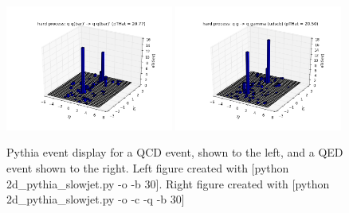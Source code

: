 \documentclass[11pt]{article}
\begin{document}
\begin{figure}[h]
\begin{center}
\includegraphics[width=0.49\textwidth]{2d_pythia_slowjet1.png}
\includegraphics[width=0.49\textwidth]{2d_pythia_slowjet2.png}
\caption{Pythia event display for a QCD event, shown to the left, and a QED event shown to the right.  Left figure created with [python 2d\_pythia\_slowjet.py -o -b 30]. Right figure created with [python 2d\_pythia\_slowjet.py -o -c -q -b 30]}
\label{fig_2d_pythia_slowjet}
\end{center}
\end{figure}
\end{document}

